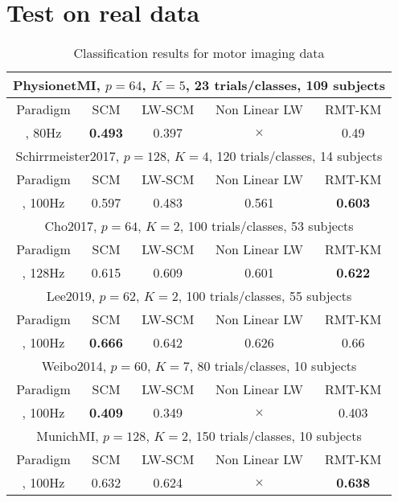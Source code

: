 \documentclass{article}
\theoremstyle{plain}
\theoremstyle{definition}
\theoremstyle{remark}
\begin{document}
\section{Test on real data}

\begin{table*}[]
    \centering
    \begin{tabular}{||c||c|c|c|c||}
    \hline
    \multicolumn{5}{|c|}{PhysionetMI, $p=64$, $K=5$, 23 trials/classes, 109 subjects} \\
    \hline
    Paradigm & SCM & LW-SCM & Non Linear LW & RMT-KM \\
    \hline
    [1,3], 80Hz & {\bf 0.493} & 0.397 & $\times$ & 0.49 \\
    \hline
    \hline
    \multicolumn{5}{|c|}{Schirrmeister2017, $p=128$, $K=4$, 120 trials/classes, 14 subjects} \\
    \hline
    Paradigm     & SCM         & LW-SCM & Non Linear LW & RMT-KM \\
    \hline
    [0,5], 100Hz & 0.597       & 0.483 & 0.561          & {\bf 0.603} \\
    \hline
    \hline
    \multicolumn{5}{|c|}{Cho2017, $p=64$, $K=2$, 100 trials/classes, 53 subjects} \\
    \hline
    Paradigm & SCM & LW-SCM & Non Linear LW & RMT-KM \\
    \hline
    [1,3], 128Hz & 0.615 & 0.609 & 0.601 & {\bf 0.622} \\
    \hline
    \hline
    \multicolumn{5}{|c|}{Lee2019, $p=62$, $K=2$, 100 trials/classes, 55 subjects} \\
    \hline
    Paradigm & SCM & LW-SCM & Non Linear LW & RMT-KM \\
    \hline
    [2,3], 100Hz & {\bf 0.666} & 0.642 & 0.626 & 0.66 \\
    \hline
    \hline
    \multicolumn{5}{|c|}{Weibo2014, $p=60$, $K=7$, 80 trials/classes, 10 subjects} \\
    \hline
    Paradigm & SCM & LW-SCM & Non Linear LW & RMT-KM \\
    \hline
    [1,3], 100Hz & {\bf 0.409} & 0.349 & $\times$ & 0.403 \\
    \hline
    \hline
    \multicolumn{5}{|c|}{MunichMI, $p=128$, $K=2$, 150 trials/classes, 10 subjects} \\
    \hline
    Paradigm & SCM & LW-SCM & Non Linear LW & RMT-KM \\
    \hline
    [0,7], 100Hz & 0.632 & 0.624 & $\times$ & {\bf 0.638} \\
    \hline
    \end{tabular}
    \caption{Classification results for motor imaging data}
    \label{tab:my_label}
\end{table*}
\end{document}
